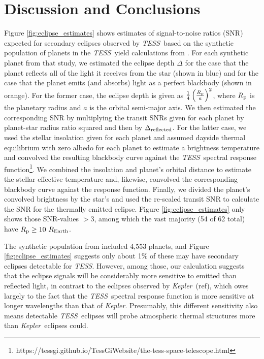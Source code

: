 \documentclass[manuscript]{aastex}
\newcommand{\kepler}{{\it Kepler}}
\newcommand{\tess}{{\it TESS}}
\begin{document}
\section{Discussion and Conclusions}
Figure \ref{fig:eclipse_estimates} shows estimates of signal-to-noise ratios (SNR) expected for secondary eclipses observed by \tess\ based on the synthetic population of planets in the \tess\ yield calculations from \citet{2018arXiv180405050B}. For each synthetic planet from that study, we estimated the eclipse depth $\Delta$ for the case that the planet reflects all of the light it receives from the star (shown in blue) and for the case that the planet emits (and absorbs) light as a perfect blackbody (shown in orange). For the former case, the eclipse depth is given as $\frac{1}{4} \left( \frac{R_{\rm p}}{a} \right)^2$, where $R_{\rm p}$ is the planetary radius and $a$ is the orbital semi-major axis. We then estimated the corresponding SNR by multiplying the transit SNRs given for each planet by planet-star radius ratio squared and then by $\Delta_{\rm reflected}$. For the latter case, we used the stellar insolation given for each planet and assumed dayside thermal equilibrium with zero albedo for each planet to estimate a brightness temperature and convolved the resulting blackbody curve against the \tess\ spectral response function\footnote{https://tessgi.github.io/TessGiWebsite/the-tess-space-telescope.html}. We combined the insolation and planet's orbital distance to estimate the stellar effective temperature and, likewise, convolved the corresponding blackbody curve against the response function. Finally, we divided the planet's convolved brightness by the star's and used the re-scaled transit SNR to calculate the SNR for the thermally emitted eclipse. Figure \ref{fig:eclipse_estimates} only shows those SNR-values $> 3$, among which the vast majority (54 of 62 total) have $R_{\rm p} \geq 10\ R_{\rm Earth}$.

The synthetic population from \citet{2018arXiv180405050B} included 4,553 planets, and Figure \ref{fig:eclipse_estimates} suggests only about 1\% of these may have secondary eclipses detectable for \tess. However, among those, our calculation suggests that the eclipse signals will be considerably more sensitive to emitted than reflected light, in contrast to the eclipses observed by \kepler\ (ref), which owes largely to the fact that the \tess\ spectral response function is more sensitive at longer wavelengths than that of \kepler. Presumably, this different sensitivity also means detectable \tess\ eclipses will probe atmospheric thermal structures more than \kepler\ eclipses could.
\end{document}
